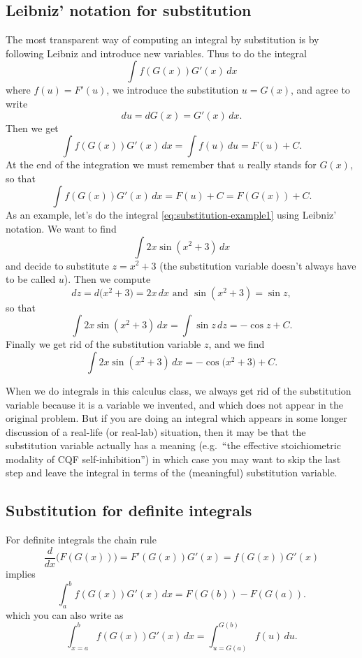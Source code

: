 \subsection{Leibniz' notation for substitution}
\label{sec:leibniz-notation}
The most transparent way of computing an integral by substitution is
by following Leibniz and introduce new variables.  Thus to do the
integral
\[
\int f(G(x)) G'(x)\,d x
\]
where $f(u) = F'(u)$, we introduce the substitution $u=G(x)$, and
agree to write
\[
d u = d G(x) = G'(x)\,d x.
\]
Then we get
\[
\int f(G(x)) G'(x)\,d x = \int f(u) \,d u = F(u)+C.
\]
At the end of the integration we must remember that $u$ really stands
for $G(x)$, so that
\[
\int f(G(x)) G'(x)\,d x = F(u)+C = F(G(x))+C.
\]
As an example, let's do the integral \eqref{eq:substitution-example1}
using Leibniz' notation.  We want to find
\[
\int 2x\sin (x^2+3)\,d x
\]
and decide to substitute $z = x^2+3$ (the substitution variable
doesn't always have to be called $u$).  Then we compute
\[
dz = d\bigl(x^2+3\bigr) = 2x\, dx \text{ and } \sin(x^2+3) = \sin z,
\]
so that
\[
\int 2x\sin (x^2+3)\,d x = \int \sin z\, dz = -\cos z +C.
\]
Finally we get rid of the substitution variable $z$, and we find
\[
\int 2x\sin (x^2+3)\,d x = -\cos\bigl(x^2+3\bigr)+C.
\]

When we do integrals in this calculus class, we always get rid of the
substitution variable because it is a variable we invented, and which
does not appear in the original problem.  But if you are doing an
integral which appears in some longer discussion of a real-life (or
real-lab) situation, then it may be that the substitution variable
actually has a meaning (e.g.\ ``the effective stoichiometric modality
of CQF self-inhibition'') in which case you may want to skip the last
step and leave the integral in terms of the (meaningful) substitution
variable.


\subsection{Substitution for definite integrals}
For definite integrals the chain rule
\[
\frac d{dx}\bigl(F(G(x))\bigr) = F'(G(x)) G'(x) = f(G(x)) G'(x)
\]
implies
\[
\int_a^b f(G(x)) G'(x)\,d x = F(G(b))-F(G(a)).
\]
which you can also write as
\begin{equation}
  \label{eq:substitution-definite-int}
  \int_{x=a}^b f(G(x)) G'(x)\,d x  = \int_{u=G(a)}^{G(b)} f(u)\,d u.
\end{equation}
